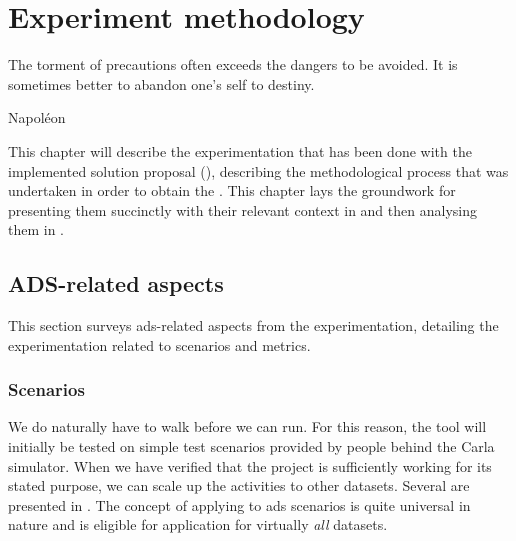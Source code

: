 \chapter{Experiment methodology}\label{chp:experiments}





\epigraph{The torment of precautions often exceeds the dangers to be avoided. It is sometimes better to abandon one's self to destiny.}{Napoléon}

This chapter will describe the experimentation that has been done with the implemented solution
proposal (), describing the methodological process that was undertaken in
order to obtain the . This chapter lays the groundwork for presenting them
succinctly with their relevant context in  and then analysing them in
.


\section{ADS-related aspects}

This section surveys \acrshort{ads}-related aspects from the experimentation,
detailing the experimentation related to scenarios and metrics.

\subsection{Scenarios}

We do naturally have to walk before we can run. For this reason, the tool will initially be
tested on simple test scenarios provided by people behind the Carla simulator. When we have verified
that the project is sufficiently working for its stated purpose, we can scale up the activities to
other datasets. Several are presented in . The concept of applying
 to \acrshort{ads} scenarios is quite universal in nature and is eligible for
application for virtually \emph{all} datasets.

